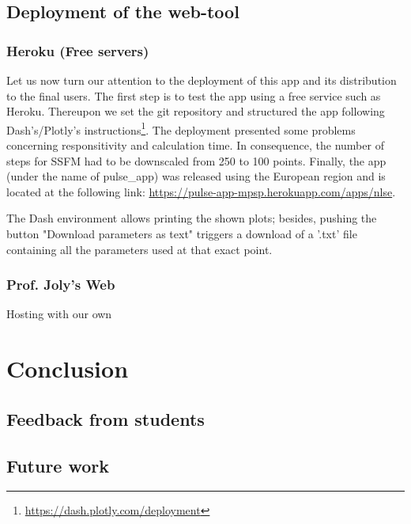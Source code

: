 



    \section{Deployment of the web-tool}
        \subsection{Heroku (Free servers)}
            Let us now turn our attention to the deployment of this app and its distribution to the final users. The first step is to test the app using a free service such as Heroku. Thereupon we set the git repository and structured the app following Dash's/Plotly's instructions\footnote{\url{https://dash.plotly.com/deployment}}. The deployment presented some problems concerning responsitivity and calculation time. In consequence, the number of steps for SSFM had to be downscaled from 250 to 100 points. Finally, the app (under the name of pulse\_app) was released using the European region and is located at the following link: \url{https://pulse-app-mpsp.herokuapp.com/apps/nlse}.
            
            The Dash environment allows printing the shown plots; besides, pushing the button "Download parameters as text" triggers a download of a '.txt' file containing all the parameters used at that exact point.
    
       
        
        
        
        \subsection{Prof. Joly's Web}
        Hosting with our own 



\chapter{Conclusion}
    \section{Feedback from students}
    \section{Future work}
    